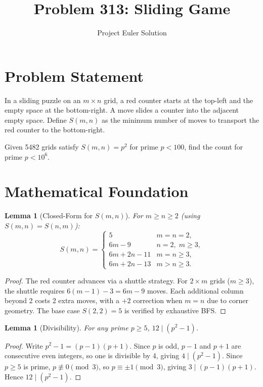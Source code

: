 \documentclass[12pt]{article}
\title{Problem 313: Sliding Game}
\author{Project Euler Solution}
\date{}
\newtheorem{lemma}[theorem]{Lemma}
\begin{document}
\maketitle

\section{Problem Statement}

In a sliding puzzle on an $m \times n$ grid, a red counter starts at the top-left and the empty space at the bottom-right. A move slides a counter into the adjacent empty space. Define $S(m,n)$ as the minimum number of moves to transport the red counter to the bottom-right.

Given 5482 grids satisfy $S(m,n) = p^2$ for prime $p < 100$, find the count for prime $p < 10^6$.

\section{Mathematical Foundation}

\begin{lemma}[Closed-Form for $S(m,n)$]
For $m \ge n \ge 2$ (using $S(m,n) = S(n,m)$):
\[
    S(m,n) = \begin{cases}
        5 & m = n = 2, \\
        6m - 9 & n = 2,\; m \ge 3, \\
        6m + 2n - 11 & m = n \ge 3, \\
        6m + 2n - 13 & m > n \ge 3.
    \end{cases}
\]
\end{lemma}

\begin{proof}
The red counter advances via a shuttle strategy. For $2 \times m$ grids ($m \ge 3$), the shuttle requires $6(m-1) - 3 = 6m-9$ moves. Each additional column beyond 2 costs 2 extra moves, with a $+2$ correction when $m = n$ due to corner geometry. The base case $S(2,2) = 5$ is verified by exhaustive BFS.
\end{proof}

\begin{lemma}[Divisibility]
For any prime $p \ge 5$, $12 \mid (p^2 - 1)$.
\end{lemma}

\begin{proof}
Write $p^2 - 1 = (p-1)(p+1)$. Since $p$ is odd, $p-1$ and $p+1$ are consecutive even integers, so one is divisible by 4, giving $4 \mid (p^2 - 1)$. Since $p \ge 5$ is prime, $p \not\equiv 0 \pmod{3}$, so $p \equiv \pm 1 \pmod{3}$, giving $3 \mid (p-1)(p+1)$. Hence $12 \mid (p^2-1)$.
\end{proof}
\end{document}
